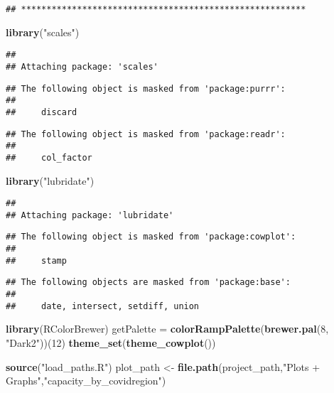 \documentclass[
]{article}
\newenvironment{Shaded}{\begin{snugshade}}{\end{snugshade}}
\newcommand{\DecValTok}[1]{\textcolor[rgb]{0.00,0.00,0.81}{#1}}
\newcommand{\KeywordTok}[1]{\textcolor[rgb]{0.13,0.29,0.53}{\textbf{#1}}}
\newcommand{\NormalTok}[1]{#1}
\newcommand{\StringTok}[1]{\textcolor[rgb]{0.31,0.60,0.02}{#1}}
\begin{document}
\begin{verbatim}
## ********************************************************
\end{verbatim}

\begin{Shaded}
\begin{Highlighting}[]
\KeywordTok{library}\NormalTok{(}\StringTok{"scales"}\NormalTok{)}
\end{Highlighting}
\end{Shaded}

\begin{verbatim}
## 
## Attaching package: 'scales'
\end{verbatim}

\begin{verbatim}
## The following object is masked from 'package:purrr':
## 
##     discard
\end{verbatim}

\begin{verbatim}
## The following object is masked from 'package:readr':
## 
##     col_factor
\end{verbatim}

\begin{Shaded}
\begin{Highlighting}[]
\KeywordTok{library}\NormalTok{(}\StringTok{"lubridate"}\NormalTok{)}
\end{Highlighting}
\end{Shaded}

\begin{verbatim}
## 
## Attaching package: 'lubridate'
\end{verbatim}

\begin{verbatim}
## The following object is masked from 'package:cowplot':
## 
##     stamp
\end{verbatim}

\begin{verbatim}
## The following objects are masked from 'package:base':
## 
##     date, intersect, setdiff, union
\end{verbatim}

\begin{Shaded}
\begin{Highlighting}[]
\KeywordTok{library}\NormalTok{(RColorBrewer)}
\NormalTok{getPalette =}\StringTok{ }\KeywordTok{colorRampPalette}\NormalTok{(}\KeywordTok{brewer.pal}\NormalTok{(}\DecValTok{8}\NormalTok{, }\StringTok{"Dark2"}\NormalTok{))(}\DecValTok{12}\NormalTok{)}
\KeywordTok{theme\_set}\NormalTok{(}\KeywordTok{theme\_cowplot}\NormalTok{())}

\KeywordTok{source}\NormalTok{(}\StringTok{"load\_paths.R"}\NormalTok{)}
\NormalTok{plot\_path \textless{}{-}}\StringTok{ }\KeywordTok{file.path}\NormalTok{(project\_path,}\StringTok{"Plots + Graphs"}\NormalTok{,}\StringTok{"capacity\_by\_covidregion"}\NormalTok{)}
\end{Highlighting}
\end{Shaded}
\end{document}
